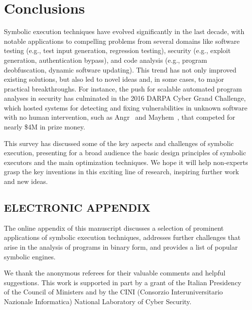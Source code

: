 
\section{Conclusions}
\label{se:conclusions}

Symbolic execution techniques have evolved significantly in the last decade, with notable applications to compelling problems from several domains like software testing (e.g., test input generation, regression testing), security (e.g., exploit generation, authentication bypass), and code analysis (e.g., program deobfuscation, dynamic software updating). This trend has not only improved existing solutions, but also led to novel ideas and, in some cases, to major practical breakthroughs. For instance, the push for scalable automated program analyses in security has culminated in the 2016 DARPA Cyber Grand Challenge, which hosted systems for detecting and fixing vulnerabilities in unknown software with no human intervention, such as {\sc Angr}~\cite{ANGR-SSP16} and {\sc Mayhem}~\cite{MAYHEM-SP12}, that competed for nearly \$4M in prize money.

This survey has discussed some of the key aspects and challenges of symbolic execution, presenting for a broad audience the basic design principles of symbolic executors and the main optimization techniques. We hope it will help non-experts grasp the key inventions in this exciting line of research, inspiring further work and new ideas.


\subsection*{ELECTRONIC APPENDIX}
The online appendix of this manuscript discusses a selection of prominent applications of symbolic execution techniques, addresses further challenges that arise in the analysis of programs in binary form, and provides a list of popular symbolic engines.

\begin{acks}
We thank the anonymous referees for their valuable comments and helpful suggestions. This work is supported in part by a grant of the Italian Presidency of the Council of Ministers and by the CINI (Consorzio Interuniversitario Nazionale Informatica) National Laboratory of Cyber Security. %
\end{acks}

